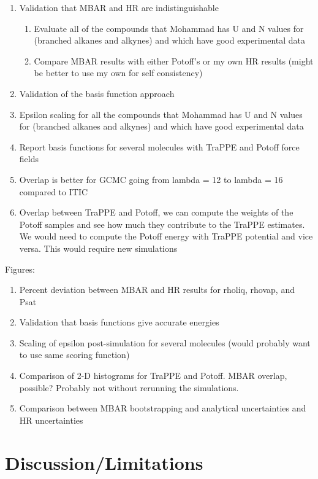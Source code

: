 \documentclass[11pt,a4paper]{article}
\begin{document}
\begin{enumerate}
	\item Validation that MBAR and HR are indistinguishable
	\begin{enumerate}
		\item Evaluate all of the compounds that Mohammad has U and N values for (branched alkanes and alkynes) and which have good experimental data
		\item Compare MBAR results with either Potoff's or my own HR results (might be better to use my own for self consistency)
	\end{enumerate}
    \item Validation of the basis function approach
    \item Epsilon scaling for all the compounds that Mohammad has U and N values for (branched alkanes and alkynes) and which have good experimental data
    \item Report basis functions for several molecules with TraPPE and Potoff force fields
    \item Overlap is better for GCMC going from lambda = 12 to lambda = 16 compared to ITIC
    \item Overlap between TraPPE and Potoff, we can compute the weights of the Potoff samples and see how much they contribute to the TraPPE estimates. We would need to compute the Potoff energy with TraPPE potential and vice versa. This would require new simulations
\end{enumerate}

Figures:

\begin{enumerate}
	\item Percent deviation between MBAR and HR results for rholiq, rhovap, and Psat
	\item Validation that basis functions give accurate energies
	\item Scaling of epsilon post-simulation for several molecules (would probably want to use same scoring function)
	\item Comparison of 2-D histograms for TraPPE and Potoff. MBAR overlap, possible? Probably not without rerunning the simulations.
	\item Comparison between MBAR bootstrapping and analytical uncertainties and HR uncertainties
\end{enumerate}

\section{Discussion/Limitations}
\end{document}
